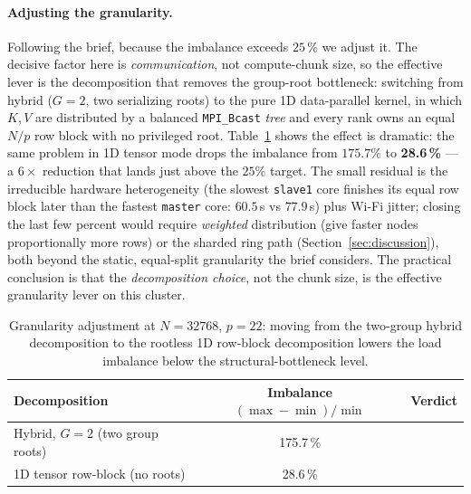 \documentclass[11pt,a4paper]{article}
\newcommand{\code}[1]{\texttt{#1}}
\newcommand{\GRANHYB}{175.7\,\%}      %
\newcommand{\GRANTEN}{28.6\,\%}       %
\begin{document}
\paragraph{Adjusting the granularity.} Following the brief, because the imbalance
exceeds $25\,\%$ we adjust it. The decisive factor here is \emph{communication},
not compute-chunk size, so the effective lever is the decomposition that removes
the group-root bottleneck: switching from hybrid ($G=2$, two serializing roots) to
the pure 1D data-parallel kernel, in which $K,V$ are distributed by a balanced
\code{MPI\_Bcast} \emph{tree} and every rank owns an equal $N/p$ row block with no
privileged root. Table~\ref{tab:gran-adjust} shows the effect is dramatic: the same
problem in 1D tensor mode drops the imbalance from $175.7\%$ to \textbf{28.6\,\%}
--- a $6\times$ reduction that lands just above the $25\%$ target. The small residual
is the irreducible hardware heterogeneity (the slowest \code{slave1} core finishes
its equal row block later than the fastest \code{master} core: $60.5$\,s vs
$77.9$\,s) plus Wi-Fi jitter; closing the last few percent would require
\emph{weighted} distribution (give faster nodes proportionally more rows) or the
sharded ring path (Section~\ref{sec:discussion}), both beyond the static,
equal-split granularity the brief considers. The practical conclusion is that the
\emph{decomposition choice}, not the chunk size, is the effective granularity lever
on this cluster.

\begin{table}[H]
\centering\small
\caption{Granularity adjustment at $N=32768$, $p=22$: moving from the
two-group hybrid decomposition to the rootless 1D row-block decomposition lowers
the load imbalance below the structural-bottleneck level.}\label{tab:gran-adjust}
\begin{tabular}{@{}lcl@{}}
\toprule
Decomposition & Imbalance $(\max-\min)/\min$ & Verdict \\
\midrule
Hybrid, $G=2$ (two group roots) & \GRANHYB & \\
1D tensor row-block (no roots)  & \GRANTEN & \\
\bottomrule
\end{tabular}
\end{table}
\end{document}
